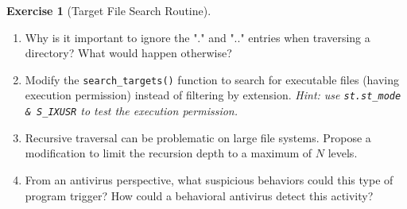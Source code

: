 \documentclass[a4paper,11pt]{article}
\theoremstyle{plain}
\theoremstyle{definition}
\newtheorem{exercice}{Exercise}
\begin{document}
\begin{exercice}[Target File Search Routine]
\begin{enumerate}
\item Why is it important to ignore the "." and ".." entries when traversing a directory? What would happen otherwise?

\item Modify the \texttt{search\_targets()} function to search for executable files (having execution permission) instead of filtering by extension.
\textit{Hint: use \texttt{st.st\_mode \& S\_IXUSR} to test the execution permission.}

\item Recursive traversal can be problematic on large file systems. Propose a modification to limit the recursion depth to a maximum of $N$ levels.

\item From an antivirus perspective, what suspicious behaviors could this type of program trigger? How could a behavioral antivirus detect this activity?
\end{enumerate}

\end{exercice}
\end{document}
